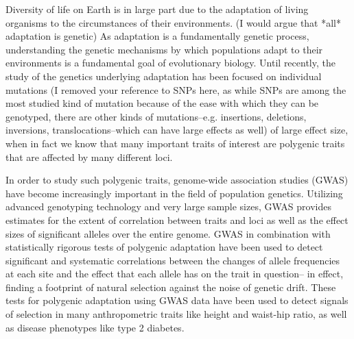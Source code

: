 \documentclass[a4paper,10pt]{article}
\newcommand{\jb}[1]{{\color{blue} (#1)} }
\begin{document}
Diversity of life on Earth is in large part due to the adaptation of living
organisms to the circumstances of their environments. \jb{I would argue that *all* adaptation is genetic} As adaptation is a fundamentally genetic process, understanding the genetic mechanisms by which populations adapt to their environments is a fundamental goal of evolutionary biology. Until recently, the study of the genetics underlying
adaptation has been focused on individual mutations \jb{I removed your reference to SNPs here, as while SNPs are among the most studied kind of mutation because of the ease with which they can be genotyped, there are other kinds of mutations--e.g. insertions, deletions, inversions, translocations--which can have large effects as well} of large
effect size, when in fact we
know that many important traits of interest are polygenic traits that are affected by many
different loci.

In order to study such polygenic traits, genome-wide association studies (GWAS) have become increasingly
important in the field of population genetics. Utilizing advanced
genotyping technology and very large sample sizes, GWAS provides
estimates for the extent of correlation between traits and loci as well as the
effect sizes of significant alleles over the entire genome. GWAS in combination with statistically rigorous tests of
polygenic adaptation have been used to detect significant and
systematic correlations between the changes of allele frequencies at
each site and the effect that each allele has on the trait in
question-- in effect, finding a footprint of natural selection
against the noise of genetic drift. These tests for polygenic
adaptation using GWAS data have been used to detect signals of
selection in many anthropometric traits like height
and waist-hip ratio, as well as disease phenotypes like type 2
diabetes\cite{gwasintro,gwasproblems}.

\begin{comment}
  huh, I did not know about the begin/end comment environment thing. nifty trick
\end{comment}
\end{document}

